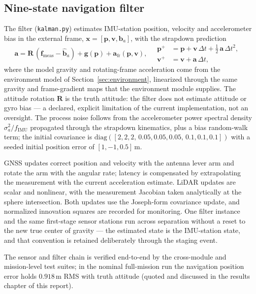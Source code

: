 \subsection{Nine-state navigation filter}

The filter (\texttt{kalman.py}) estimates \ac{IMU}-station position,
velocity and accelerometer bias in the external frame,
$\mathbf{x} = [\mathbf{p}, \mathbf{v}, \mathbf{b}_a]$, with the
strapdown prediction
%
\begin{equation}
\label{eq:nav-predict}
\mathbf{a} = \mathbf{R}\,(\mathbf{f}_{\mathrm{meas}} - \hat{\mathbf{b}}_a)
+ \mathbf{g}(\mathbf{p}) + \mathbf{a}_{\mathrm{fr}}(\mathbf{p},\mathbf{v}),
\quad
\begin{aligned}
\mathbf{p}^{+} &= \mathbf{p} + \mathbf{v}\,\Delta t
+ \tfrac{1}{2}\,\mathbf{a}\,\Delta t^2, \\
\mathbf{v}^{+} &= \mathbf{v} + \mathbf{a}\,\Delta t,
\end{aligned}
\end{equation}
%
where the model gravity and rotating-frame acceleration come from the
environment model of Section~\ref{sec:environment}, linearized through
the same gravity and frame-gradient maps that the environment module
supplies. The attitude rotation $\mathbf{R}$ is the truth attitude: the
filter does not estimate attitude or gyro bias --- a declared, explicit
limitation of the current implementation, not an oversight. The process
noise follows from the accelerometer power spectral density
$\sigma_a^2 / f_{\mathrm{IMU}}$ propagated through the strapdown
kinematics, plus a bias random-walk term; the initial covariance is
$\mathrm{diag}([2,2,2,\,0.05,0.05,0.05,\,0.1,0.1,0.1])$ with a seeded
initial position error of $[1, -1, 0.5]\,\mathrm{m}$.

GNSS updates correct position and velocity with the antenna lever arm
and rotate the arm with the angular rate; latency is compensated by
extrapolating the measurement with the current acceleration estimate.
LiDAR updates are scalar and nonlinear, with the measurement Jacobian
taken analytically at the sphere intersection. Both updates use the
Joseph-form covariance update, and normalized innovation squares are
recorded for monitoring. One filter instance and the same first-stage
sensor stations run across separation without a reset to the new true
center of gravity --- the estimated state is the IMU-station state, and
that convention is retained deliberately through the staging event.

The sensor and filter chain is verified end-to-end by the cross-module
and mission-level test suites; in the nominal full-mission run the
navigation position error holds $0.918\,\mathrm{m}$ \ac{RMS} with truth
attitude (quoted and discussed in the results chapter of this report).
